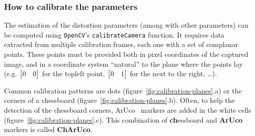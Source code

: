 \subsubsection{How to calibrate the parameters}

The estimation of the distortion parameters (among with other parameters) can be computed using \texttt{OpenCV}'s \texttt{calibrateCamera} function.
It requires data extracted from multiple calibration frames, each one with a set of complanar points.
These points must be provided both in pixel coordinates of the captured image, and in a coordinate system ``natural'' to the plane where the points lay (e.g. $\begin{bmatrix} 0 & 0 \end{bmatrix}$ for the topleft point, $\begin{bmatrix} 0 & 1 \end{bmatrix}$ for the next to the right, \dots).

Common calibration patterns are dots (figure~\ref{fig:calibration-planes}.a) or the corners of a chessboard (figure~\ref{fig:calibration-planes}.b).
Often, to help the detection of the chessboard corners, ArUco~\cite{aruco} markers are added in the white cells (figure~\ref{fig:calibration-planes}.c).
This combination of \textbf{ch}essboard and \textbf{ArUco} markers is called \textbf{ChArUco}.

